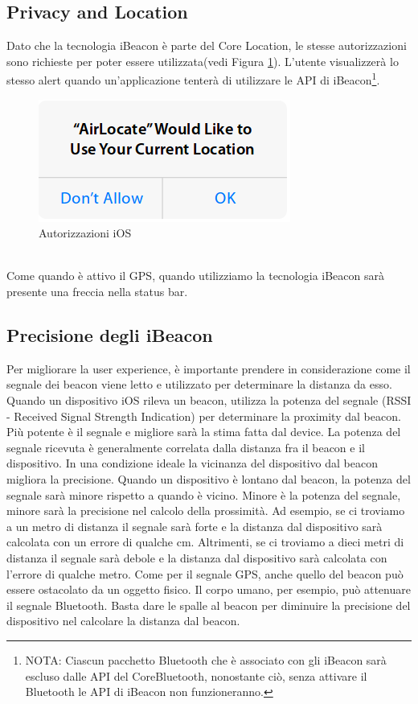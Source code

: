 \subsection{Privacy and Location}
Dato che la tecnologia iBeacon è parte del Core Location, le stesse autorizzazioni sono richieste per poter essere utilizzata(vedi Figura \ref{fig:autorizzazioni}).
L'utente visualizzerà lo stesso alert quando un'applicazione tenterà di utilizzare le API di iBeacon\footnote{NOTA: Ciascun pacchetto Bluetooth che è associato con gli iBeacon sarà escluso dalle API del CoreBluetooth, nonostante ciò, senza attivare il Bluetooth le API di iBeacon non funzioneranno.}.
\begin{figure}[t]
\centering
\includegraphics[scale=0.6]{Immagini/alert.png}
\caption{Autorizzazioni iOS} 
\label{fig:autorizzazioni}
\end{figure}\\
Come quando è attivo il GPS, quando utilizziamo la tecnologia iBeacon sarà presente una freccia nella status bar.
\subsection{Precisione degli iBeacon}
Per migliorare la user experience, è importante prendere in considerazione come il segnale dei beacon viene letto e utilizzato per determinare la distanza da esso. 
Quando un dispositivo iOS rileva un beacon, utilizza la potenza del segnale (RSSI - Received Signal Strength Indication) per determinare la proximity dal beacon.
Più potente è il segnale e migliore sarà la stima fatta dal device.
La potenza del segnale ricevuta è generalmente correlata dalla distanza fra il beacon e il dispositivo. 
In una condizione ideale la vicinanza del dispositivo dal beacon migliora la precisione.
Quando un dispositivo è lontano dal beacon, la potenza del segnale sarà minore rispetto a quando è vicino. 
Minore è la potenza del segnale, minore sarà la precisione nel calcolo della prossimità. 
Ad esempio, se ci troviamo a un metro di distanza il segnale sarà forte e la distanza dal dispositivo sarà calcolata con un errore di qualche cm.
Altrimenti, se ci troviamo a dieci metri di distanza il segnale sarà debole e la distanza dal dispositivo sarà calcolata con l'errore di qualche metro. 
Come per il segnale GPS, anche quello del beacon può essere ostacolato da un oggetto fisico.  
Il corpo umano, per esempio, può attenuare il segnale Bluetooth. 
Basta dare le spalle al beacon per diminuire la precisione del dispositivo nel calcolare la distanza dal beacon.

